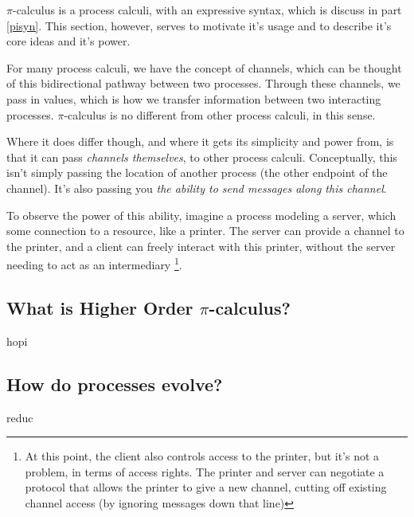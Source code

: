 $\pi$-calculus is a process calculi, with an expressive syntax, which is discuss in part \ref{pisyn}. This section, however, serves to motivate it's usage and to describe it's core ideas and it's power.

For many process calculi, we have the concept of channels, which can be thought of this bidirectional pathway between two processes. Through these channels, we pass in values, which is how we transfer information between two interacting processes. $\pi$-calculus is no different from other process calculi, in this sense.

Where it does differ though, and where it gets its simplicity and power from, is that it can pass \textit{channels themselves}, to other process calculi. Conceptually, this isn't simply passing the location of another process (the other endpoint of the channel). It's also passing you \textit{the ability to send messages along this channel}.

To observe the power of this ability, imagine a process modeling a server, which some connection to a resource, like a printer. The server can provide a channel to the printer, and a client can freely interact with this printer, without the server needing to act as an intermediary \footnote{At this point, the client also controls access to the printer, but it's not a problem, in terms of access rights. The printer and server can negotiate a protocol that allows the printer to give a new channel, cutting off existing channel access (by ignoring messages down that line)}.

\subsection{What is Higher Order \texorpdfstring{$\pi$}{pi}-calculus?}
{hopi}

\subsection{How do processes evolve?}
{reduc}